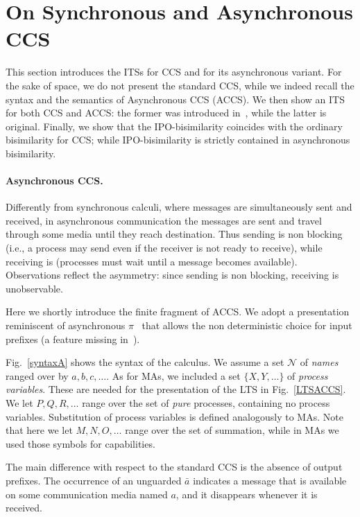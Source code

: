\documentclass[copyright,creativecommons]{eptcs}
\newcommand{\<}{\langle}
\renewcommand{\>}{\rangle}
\begin{document}
\section{On Synchronous and Asynchronous CCS}\label{sec:CCS}
This section introduces the ITSs for CCS and for its asynchronous
variant.  For the sake of space, we do not present the standard CCS,
while we indeed recall the syntax and the semantics of Asynchronous
CCS (ACCS). We then show an ITS for both CCS and ACCS: the former was
introduced in~\cite{bgk:bisimulation-graph-enc}, while the latter is
original. Finally, we show that the IPO-bisimilarity coincides with
the ordinary bisimilarity for CCS; while IPO-bisimilarity is strictly
contained in asynchronous bisimilarity.

\paragraph{Asynchronous CCS.}
Differently from synchronous calculi, where messages are
simultaneously sent and received, in asynchronous communication the
messages are sent and travel through some media until they reach
destination. Thus sending is non blocking (i.e., a process may send
even if the receiver is not ready to receive), while receiving is
(processes must wait until a message becomes available).
Observations reflect the asymmetry: since sending is non blocking,
receiving is unobservable.

Here we shortly introduce the finite fragment of ACCS.
We adopt a presentation reminiscent of
asynchronous $\pi$~\cite{AmadioCS98} that allows the non
deterministic choice for input prefixes (a feature missing
in~\cite{BorealeNP98,CastellaniH98}).



Fig.~\ref{syntaxA} shows the syntax of the calculus. We assume a set
$\mathcal N$ of \emph{names} ranged over by $a, b, c, \ldots$.
As for MAs, we included a set $\{X, Y, \ldots\}$ of \emph{process
  variables}. These are needed for the presentation of the LTS in
Fig.~\ref{LTSACCS}.
We let $P,Q,R, \ldots$ range over the set of \emph{pure} processes,
containing no process variables. Substitution of process variables is
defined analogously to MAs. Note that here we let $M,N,O, \ldots$
range over the set of summation, while in MAs we used
those symbols for capabilities.

The main difference with respect to the standard CCS \cite{MIL:CAC} is the absence of
output prefixes. The occurrence of an unguarded $\bar{a}$ indicates
a message that is available on some communication media named $a$,
and it disappears whenever it is received.
\end{document}
